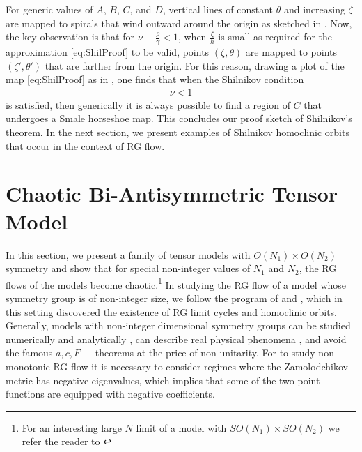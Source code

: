 For generic values of $A$, $B$, $C$, and $D$, vertical lines of constant $\theta$ and increasing $\zeta$ are mapped to spirals that wind outward around the origin as sketched in . Now, the key observation is that for $\nu \equiv \frac{\rho}{\gamma} < 1$, when $\frac{\zeta}{h}$ is small as required for the approximation \cref{eq:ShilProof} to be valid, points $(\zeta,\theta)$ are mapped to points $(\zeta',\theta')$ that are farther from the origin. For this reason, drawing a plot of the map \cref{eq:ShilProof} as in , one finds that when the Shilnikov condition
\begin{align}
\nu < 1 \label{eq:ShilnikovCondition}
\end{align}
is satisfied, then generically it is always possible to find a region of $C$ that undergoes a Smale horseshoe map. This concludes our proof sketch of Shilnikov's theorem. In the next section, we present examples of Shilnikov homoclinic orbits that occur in the context of RG flow.


\section{Chaotic Bi-Antisymmetric Tensor Model}\label{sec:model}
\label{sec:QFT}
In this section, we present a family of tensor models \cite{Klebanov:2016xxf,Klebanov:2018fzb} with $O(N_1)\times O(N_2)$ symmetry and show that for special non-integer values of $N_1$ and $N_2$, the RG flows of the models become chaotic.\footnote{ For an interesting large $N$ limit of a model with $SO(N_1)\times SO(N_2)$ we refer the reader to \cite{Chaudhuri:2020xxb,kapoor2021bifundamental}} In studying the RG flow of a model whose symmetry group is of non-integer size, we follow the program of \cite{Jepsen:2020czw} and \cite{Jepsen2021HomoclinicRG}, which in this setting discovered the existence of RG limit cycles and homoclinic orbits. Generally, models with non-integer dimensional symmetry groups can be studied numerically and analytically \cite{Binder:2019zqc,gorbenko2018walking}, can describe real physical phenomena \cite{de1979scaling}, and avoid the famous $a,c,F-$ theorems \cite{zamolodchikov1986irreversibility,Komargodski:2011vj,Klebanov:2011gs,Jafferis:2011zi} at the price of non-unitarity. For to study non-monotonic RG-flow it is necessary to consider regimes where the Zamolodchikov metric has negative eigenvalues, which implies that some of the two-point functions are equipped with negative coefficients.

